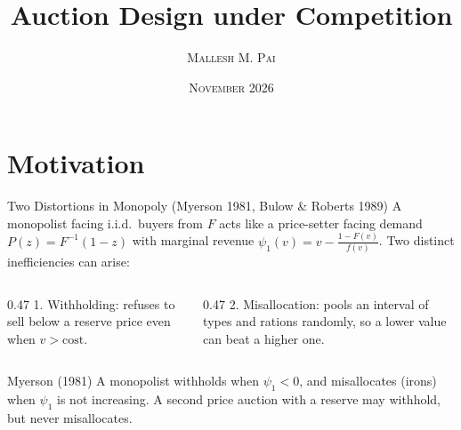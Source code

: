 \documentclass[11pt,aspectratio=169,handout]{beamer}
\def\seg#1#2#3#4{\fill[#3,draw=InkTwo,line width=0.3pt] (#1,#4) rectangle (#2,#4+0.42);}
\begin{document}
\title[Auction Design under Competition]{Auction Design under Competition}
\author[Mallesh Pai]{\large\textsc{Mallesh M. Pai}}
\institute[Tempo]{\vspace{4mm}\inserttitlegraphic}
\date{\textsc{November 2026}}

\begin{frame}
\maketitle
\end{frame}

\section{Motivation}

\begin{frame}{Two Distortions in Monopoly (Myerson 1981, Bulow \& Roberts 1989)}
A monopolist facing i.i.d.\ buyers from $F$ acts like a price-setter facing demand $P(z)=F^{-1}(1-z)$ with marginal revenue $\psi_1(v)=v-\frac{1-F(v)}{f(v)}$. Two distinct inefficiencies can arise:

\medskip
\begin{columns}[T]
\begin{column}{0.47\textwidth}
1. \alert{Withholding}: refuses to sell below a reserve price even when $v > \text{cost}$.

\bigskip
\centering
{}
\end{column}
\begin{column}{0.47\textwidth}
2. \alert{Misallocation}: \alert{pools} an interval of types and rations randomly, so a lower value can beat a higher one.

\bigskip
\centering
{}
\end{column}
\end{columns}

\bigskip{}
\begin{block}{Myerson (1981)}
A monopolist withholds when $\psi_1 < 0$, and misallocates (irons) when $\psi_1$ is not increasing. A second price auction with a reserve may withhold, but never misallocates.
\end{block}
\end{frame}
\end{document}
